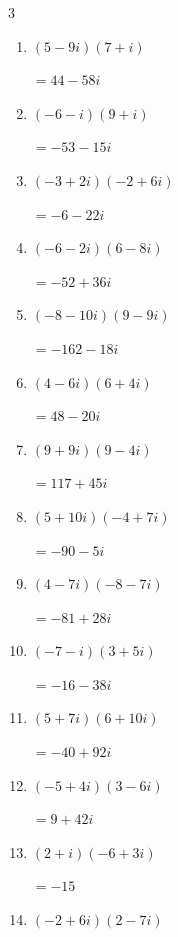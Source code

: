 \begin{multicols}{3}
\begin{enumerate}
  \item $\displaystyle (5-9i)(7+i)$

        $\displaystyle =44-58i$

  \item $\displaystyle (-6-i)(9+i)$

        $\displaystyle =-53-15i$

  \item $\displaystyle (-3+2i)(-2+6i)$

        $\displaystyle =-6-22i$

  \item $\displaystyle (-6-2i)(6-8i)$

        $\displaystyle =-52+36i$

  \item $\displaystyle (-8-10i)(9-9i)$

        $\displaystyle =-162-18i$

  \item $\displaystyle (4-6i)(6+4i)$

        $\displaystyle =48-20i$

  \item $\displaystyle (9+9i)(9-4i)$

        $\displaystyle =117+45i$

  \item $\displaystyle (5+10i)(-4+7i)$

        $\displaystyle =-90-5i$

  \item $\displaystyle (4-7i)(-8-7i)$

        $\displaystyle =-81+28i$

  \item $\displaystyle (-7-i)(3+5i)$

        $\displaystyle =-16-38i$

\columnbreak %

  \item $\displaystyle (5+7i)(6+10i)$

        $\displaystyle =-40+92i$

  \item $\displaystyle (-5+4i)(3-6i)$

        $\displaystyle =9+42i$

  \item $\displaystyle (2+i)(-6+3i)$

        $\displaystyle =-15$

  \item $\displaystyle (-2+6i)(2-7i)$


\end{enumerate}
\end{multicols}
